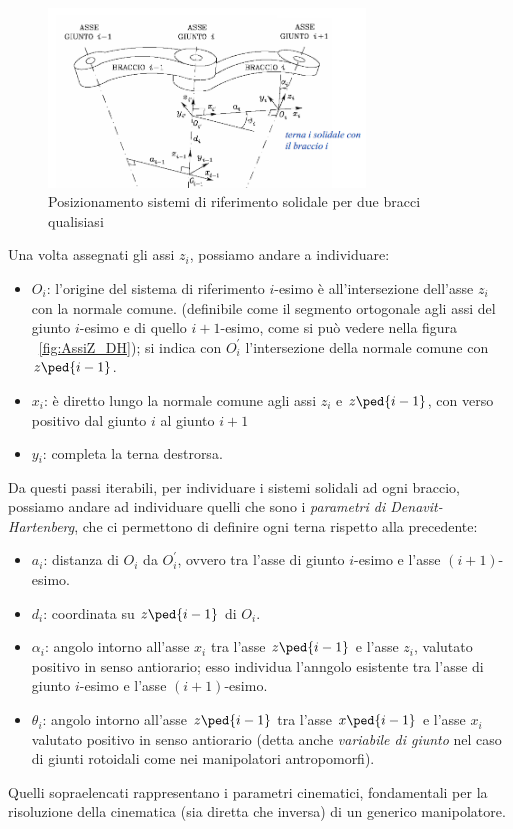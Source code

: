 \begin{figure}
	\centering
	\includegraphics[width=0.75\textwidth]{Immagini/AsseZ_DH}
	\caption{Posizionamento sistemi di riferimento solidale per due bracci qualisiasi} 
	\label{fig:AssiZ_DH}
\end{figure}
Una volta assegnati gli assi $z_i$, possiamo andare a individuare:
\begin{itemize}
	\item \textsc{$O_i$}: l'origine del sistema di riferimento $i$-esimo è all'intersezione dell'asse $z_i$ con la normale comune. 
	(definibile come il segmento ortogonale agli assi del giunto $i$-esimo e di quello $i+1$-esimo, come si può vedere nella figura ~\vref{fig:AssiZ_DH}); si indica con $O^{'}_{i}$ l'intersezione della normale comune con $z\ped{i-1}$.
	\item \textsc{$x_i$}: è diretto lungo la normale comune agli assi $z_i$ e $z\ped{i-1}$, con verso positivo dal giunto $i$ al giunto $i+1$
	\item \textsc{$y_i$}: completa la terna destrorsa.	
\end{itemize}
\newpage
Da questi passi iterabili, per individuare i sistemi solidali ad ogni braccio, possiamo andare ad individuare quelli che sono i \emph{parametri di Denavit-Hartenberg}, che ci permettono di definire ogni terna rispetto alla precedente:
\begin{itemize}
 	\item \textsc{$a_i$}: distanza di $O_i$ da $O^{'}_{i}$, ovvero tra l'asse di giunto $i$-esimo e l'asse $(i+1)$-esimo.
	\item \textsc{$d_i$}: coordinata su $z\ped{i-1}$ di $O_i$.
	\item \textsc{$\alpha_i$}: angolo intorno all'asse $x_i$ tra l'asse $z\ped{i-1}$ e l'asse $z_i$, valutato positivo in senso antiorario; esso individua l'anngolo esistente tra l'asse di giunto $i$-esimo e l'asse $(i+1)$-esimo.
	\item \textsc{$\theta_i$}: angolo intorno all'asse $z\ped{i-1}$ tra l'asse $x\ped{i-1}$ e l'asse $x_i$ valutato positivo in senso antiorario	(detta anche \emph{variabile di giunto} nel caso di giunti rotoidali come nei manipolatori antropomorfi).
\end{itemize}
Quelli sopraelencati rappresentano i parametri cinematici, fondamentali per la risoluzione della cinematica (sia diretta che inversa) di un generico manipolatore.


